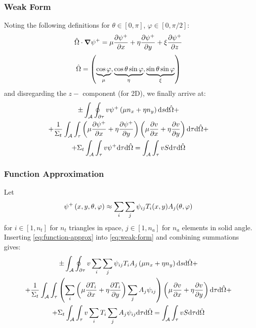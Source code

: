 \begin{frame}
  \frametitle{Weak Form}
  Noting the following definitions for $\theta\in[0,\pi]$, $\varphi\in[0,\pi/2]$:
  \begin{equation}
    \hat{\Omega}\cdot\grad{\psi^+}=\mu\pdv{\psi^+}{x}+\eta\pdv{\psi^+}{y}+\xi\pdv{\psi^+}{z}
  \end{equation}
  \begin{equation}
    \hat{\Omega}=\left(\underbrace{\cos\varphi}_\mu,\underbrace{\cos\theta\sin\varphi}_\eta,\underbrace{\sin\theta\sin\varphi}_\xi\right)
  \end{equation}
  and disregarding the $z-$ component (for 2D), we finally arrive at:
  \begin{multline}\label{eq:weak-form}
    \pm\int_{\mathcal{A}}\oint_{\partial\tau}v\psi^+\left(\mu n_x+\eta n_y\right)\dd s\dd\hat{\Omega} +\\+\frac{1}{\Sigma_t}
    \int_{\mathcal{A}}\int_{\tau}\left(\mu\pdv{\psi^+}{x}+\eta\pdv{\psi^+}{y}\right)\left(\mu\pdv{v}{x}+\eta\pdv{v}{y}\right)\dd \tau \dd \hat{\Omega}+\\
    +\Sigma_t\int_{\mathcal{A}}\int_{\tau} v \psi^+\dd \tau \dd \hat{\Omega}=\int_{\mathcal{A}}\int_{\tau} vS\dd \tau \dd \hat{\Omega}
  \end{multline}
\end{frame}

\begin{frame}
  \frametitle{Function Approximation}
  Let
  \begin{equation}
    \label{eq:function-approx}
    \psi^+ \left(x,y,\theta,\varphi\right)\approx\sum_i\sum_j \psi_{ij}T_i(x,y)A_j(\theta,\varphi)
  \end{equation}
  for $i\in[1,n_t]$ for $n_t$ triangles in space, $j\in[1,n_a]$ for $n_a$ elements in solid angle.
  Inserting \cref{eq:function-approx} into \cref{eq:weak-form} and combining summations gives:
  \begin{multline}\label{eq:function-exp-fem}
    \pm\int_{\mathcal{A}}\oint_{\partial\tau}v\sum_i\sum_j \psi_{ij}T_iA_j\left(\mu n_x+\eta n_y\right)\dd s\dd\hat{\Omega} +\\+
    \frac{1}{\Sigma_t}\int_{\mathcal{A}}\int_{\tau} \left(\sum_i\left(\mu\pdv{T_i}{x}+\eta\pdv{T_i}{y}\right)\sum_jA_j\psi_{ij}\right)\left(\mu\pdv{v}{x}+\eta\pdv{v}{y}\right)\dd \tau \dd \hat{\Omega}+\\+
    \Sigma_t\int_{\mathcal{A}}\int_{\tau} v\sum_i T_i \sum_jA_j \psi_{ij}\dd \tau \dd \hat{\Omega} = \int_{\mathcal{A}}\int_{\tau} vS\dd \tau \dd \hat{\Omega}
  \end{multline}
\end{frame}

